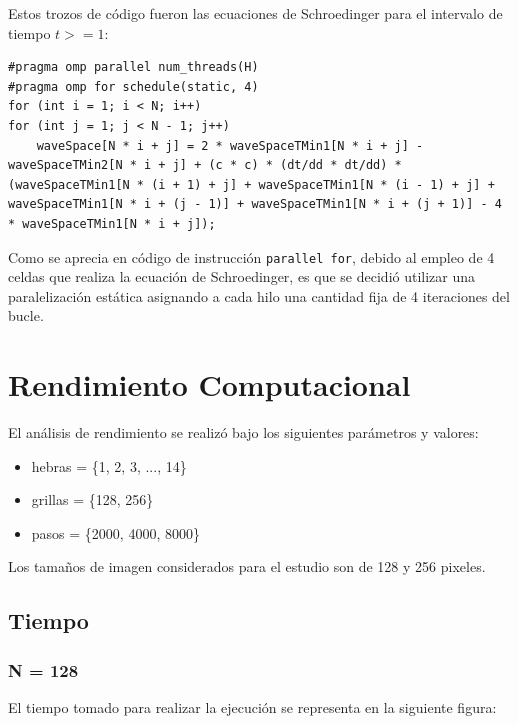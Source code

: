 \documentclass[jou]{apa6}
\begin{document}
Estos trozos de código fueron las ecuaciones de Schroedinger para el intervalo de tiempo $t >= 1$:

\lstset{language=C, breaklines=true, frame=single}

\begin{lstlisting}
#pragma omp parallel num_threads(H)
#pragma omp for schedule(static, 4)
for (int i = 1; i < N; i++)
for (int j = 1; j < N - 1; j++)
	waveSpace[N * i + j] = 2 * waveSpaceTMin1[N * i + j] - waveSpaceTMin2[N * i + j] + (c * c) * (dt/dd * dt/dd) * (waveSpaceTMin1[N * (i + 1) + j] + waveSpaceTMin1[N * (i - 1) + j] + waveSpaceTMin1[N * i + (j - 1)] + waveSpaceTMin1[N * i + (j + 1)] - 4 * waveSpaceTMin1[N * i + j]);
\end{lstlisting}

Como se aprecia en código de instrucción \texttt{parallel for}, debido al empleo de 4 celdas que realiza la ecuación de Schroedinger, es que se decidió utilizar una paralelización estática asignando a cada hilo una cantidad fija de 4 iteraciones del bucle. 

\section{Rendimiento Computacional}

El análisis de rendimiento se realizó bajo los siguientes parámetros y valores:

\begin{itemize}
	\item hebras = \{1, 2, 3, ..., 14\}
	\item grillas = \{128, 256\}
	\item pasos = \{2000, 4000, 8000\}
\end{itemize}

Los tamaños de imagen considerados para el estudio son de 128 y 256 pixeles.

\subsection{Tiempo}

\subsubsection{N = 128}
El tiempo tomado para realizar la ejecución se representa en la siguiente figura:

\clearpage
\end{document}

